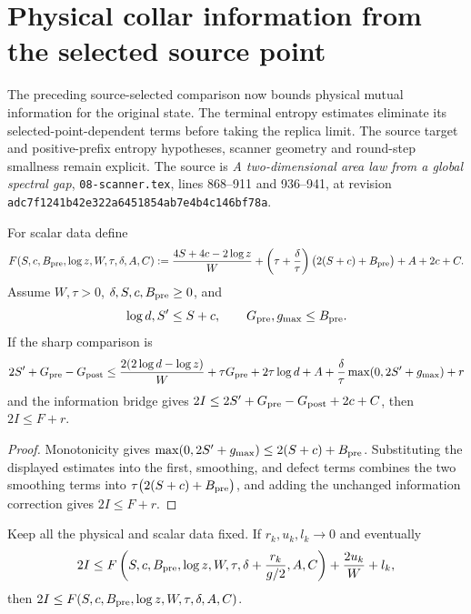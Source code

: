 \section{Physical collar information from the selected source point}
\label{sec:source-actual-information}

The preceding source-selected comparison now bounds physical mutual
information for the original state.  The terminal entropy estimates
eliminate its selected-point-dependent terms before taking the replica
limit.  The source target and positive-prefix entropy hypotheses,
scanner geometry and round-step smallness remain explicit.
The source is \emph{A two-dimensional area law from a global spectral gap},
\texttt{08-scanner.tex}, lines 868--911 and 936--941, at revision
\texttt{adc7f1241b42e322a6451854ab7e4b4c146bf78a}.

\begin{lemma}
    \label{thm:sharp-information-scalar}
    \leanok
    For scalar data define
    \[
        F(S,c,B_{\rm pre},\log z,W,\tau,\delta,A,C)
        :=\frac{4S+4c-2\log z}{W}
        +\left(\tau+\frac{\delta}{\tau}\right)
        \bigl(2(S+c)+B_{\rm pre}\bigr)+A+2c+C.
    \]
    Assume $W,\tau>0$, $\delta,S,c,B_{\rm pre}\geq0$, and
    \[
        \log d,S'\leq S+c,\qquad
        G_{\rm pre},g_{\max}\leq B_{\rm pre}.
    \]
    If the sharp comparison is
    \[
        2S'+G_{\rm pre}-G_{\rm post}
        \leq\frac{2(2\log d-\log z)}{W}
        +\tau G_{\rm pre}+2\tau\log d+A
        +\frac{\delta}{\tau}\max(0,2S'+g_{\max})+r
    \]
    and the information bridge gives
    $2I\leq2S'+G_{\rm pre}-G_{\rm post}+2c+C$, then $2I\leq F+r$.
\end{lemma}

\begin{proof}
    \leanok
    Monotonicity gives
    $\max(0,2S'+g_{\max})\leq2(S+c)+B_{\rm pre}$.
    Substituting the displayed estimates into the first, smoothing, and defect
    terms combines the two smoothing terms into
    $\tau\bigl(2(S+c)+B_{\rm pre}\bigr)$, and adding the unchanged information
    correction gives $2I\leq F+r$.
\end{proof}

\begin{lemma}
    \label{thm:sharp-information-replica-limit}
    \leanok
    Keep all the physical and scalar data fixed.  If
    $r_k,u_k,l_k\to0$ and eventually
    \[
        2I\leq F\left(S,c,B_{\rm pre},\log z,W,\tau,
        \delta+\frac{r_k}{g/2},A,C\right)
        +\frac{2u_k}{W}+l_k,
    \]
    then $2I\leq F(S,c,B_{\rm pre},\log z,W,\tau,\delta,A,C)$.
\end{lemma}

